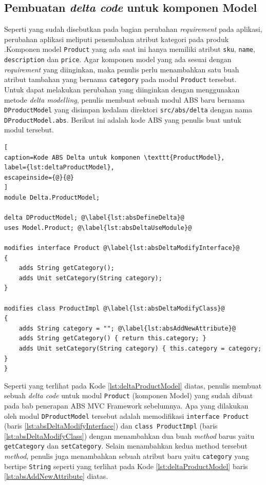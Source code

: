 \subsection{Pembuatan \textit{delta code} untuk komponen Model}

Seperti yang sudah disebutkan pada bagian perubahan \textit{requirement} pada aplikasi, perubahan aplikasi meliputi penembahan atribut kategori pada produk .Komponen model \texttt{Product} yang ada saat ini hanya memiliki atribut \texttt{sku}, \texttt{name}, \texttt{description} dan \texttt{price}. Agar komponen model yang ada sesuai dengan \textit{requirement} yang diinginkan, maka penulis perlu menambahkan satu buah atribut tambahan yang bernama \texttt{category} pada modul \texttt{Product} tersebut.\\

Untuk dapat melakukan perubahan yang diinginkan dengan menggunakan metode \textit{delta modelling}, penulis membuat sebuah modul ABS baru bernama \texttt{DProductModel} yang disimpan kedalam direktori \texttt{src/abs/delta} dengan nama \texttt{DProductModel.abs}. Berikut ini adalah kode ABS yang penulis buat untuk modul tersebut.

\begin{lstlisting}[
caption=Kode ABS Delta untuk komponen \texttt{ProductModel},
label={lst:deltaProductModel},
escapeinside={@}{@}
]
module Delta.ProductModel;

delta DProductModel; @\label{lst:absDefineDelta}@
uses Model.Product; @\label{lst:absDeltaUseModule}@

modifies interface Product @\label{lst:absDeltaModifyInterface}@
{
	adds String getCategory();
	adds Unit setCategory(String category);
}

modifies class ProductImpl @\label{lst:absDeltaModifyClass}@
{
	adds String category = ""; @\label{lst:absAddNewAttribute}@
	adds String getCategory() { return this.category; }
	adds Unit setCategory(String category) { this.category = category; }
}
\end{lstlisting}

Seperti yang terlihat pada Kode \ref{lst:deltaProductModel} diatas, penulis membuat sebuah \textit{delta code} untuk modul \texttt{Product} (komponen Model) yang sudah dibuat pada bab penerapan ABS MVC Framework sebelumnya. Apa yang dilakukan oleh modul \texttt{DProductModel} tersebut adalah memodifikasi \texttt{interface Product} (baris \ref{lst:absDeltaModifyInterface}) dan \texttt{class ProductImpl} (baris \ref{lst:absDeltaModifyClass}) dengan menambahkan dua buah \textit{method} barus yaitu \texttt{getCategory} dan \texttt{setCategory}. Selain menambahkan kedua method tersebut \textit{method}, penulis juga menambahkan sebuah atribut baru yaitu \texttt{category} yang bertipe \texttt{String} seperti yang terlihat pada Kode \ref{lst:deltaProductModel} baris \ref{lst:absAddNewAttribute} diatas.\\

